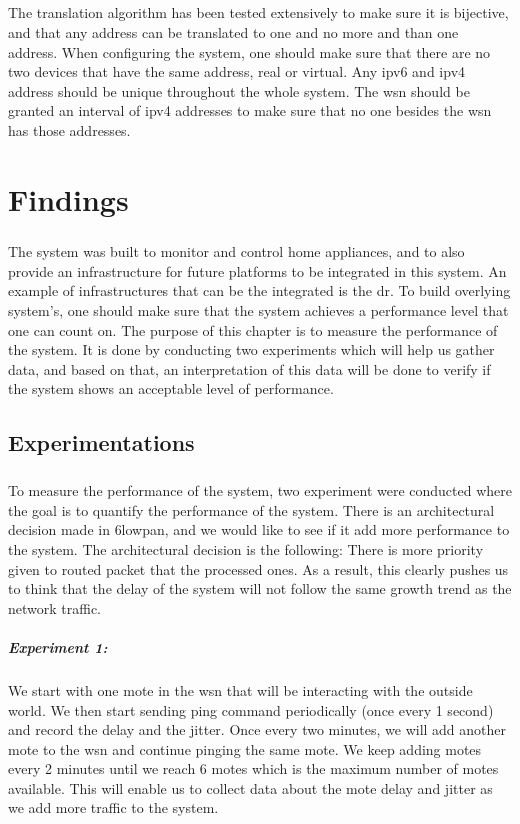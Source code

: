 \documentclass[oneside,12pt,a4paper,final]{book}
\begin{document}
\paragraph{}
The translation algorithm has been tested extensively to make sure it is bijective, and that any address can be translated to one and no more and than one address. When configuring the system, one should make sure that there are no two devices that have the same address, real or virtual. Any \gls{ipv6} and \gls{ipv4} address should be unique throughout the whole system. The \gls{wsn} should be granted an interval of \gls{ipv4} addresses to make sure that no one besides the \gls{wsn} has those addresses.


\chapter{Findings}
\paragraph{}
The system was built to monitor and control home appliances, and to also provide an infrastructure for future platforms to be integrated in this system. An example of infrastructures that can be the integrated is the \gls{dr}. To build overlying system's, one should make sure that the system achieves a performance level that one can count on. The purpose of this chapter is to measure the performance of the system. It is done by conducting two experiments which will help us gather data, and based on that, an interpretation of this data will be done to verify if the system shows an acceptable level of performance.
\section{Experimentations}
\paragraph{}
To measure the performance of the system, two experiment were conducted where the goal is to quantify the performance of the system. There is an architectural decision made in \gls{6lowpan}, and we would like to see if it add more performance to the system. The architectural decision is the following: There is more priority given to routed packet that the processed ones. As a result, this clearly pushes us to think that the delay of the system will not follow the same growth trend as the network traffic.
\paragraph{Experiment 1:}
We start with one mote in the \gls{wsn} that will be interacting with the outside world. We then start sending ping command periodically (once every 1 second) and record the delay and the jitter. Once every two minutes, we will add another mote to the \gls{wsn} and continue pinging the same mote. We keep adding motes every 2 minutes until we reach 6 motes which is the maximum number of motes available. This will enable us to collect data about the mote delay and jitter as we add more traffic to the system.
\end{document}
